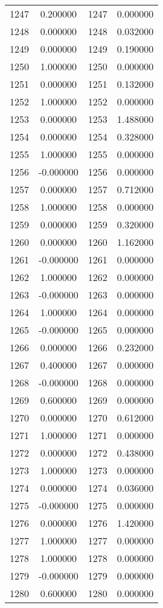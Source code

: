 \documentclass[12pt]{article}
\begin{document}
\begin{longtable}{@{}cccc@{}}
1247 & 0.200000 & 1247 & 0.000000 \\
1248 & 0.000000 & 1248 & 0.032000 \\
1249 & 0.000000 & 1249 & 0.190000 \\
1250 & 1.000000 & 1250 & 0.000000 \\
1251 & 0.000000 & 1251 & 0.132000 \\
1252 & 1.000000 & 1252 & 0.000000 \\
1253 & 0.000000 & 1253 & 1.488000 \\
1254 & 0.000000 & 1254 & 0.328000 \\
1255 & 1.000000 & 1255 & 0.000000 \\
1256 & -0.000000 & 1256 & 0.000000 \\
1257 & 0.000000 & 1257 & 0.712000 \\
1258 & 1.000000 & 1258 & 0.000000 \\
1259 & 0.000000 & 1259 & 0.320000 \\
1260 & 0.000000 & 1260 & 1.162000 \\
1261 & -0.000000 & 1261 & 0.000000 \\
1262 & 1.000000 & 1262 & 0.000000 \\
1263 & -0.000000 & 1263 & 0.000000 \\
1264 & 1.000000 & 1264 & 0.000000 \\
1265 & -0.000000 & 1265 & 0.000000 \\
1266 & 0.000000 & 1266 & 0.232000 \\
1267 & 0.400000 & 1267 & 0.000000 \\
1268 & -0.000000 & 1268 & 0.000000 \\
1269 & 0.600000 & 1269 & 0.000000 \\
1270 & 0.000000 & 1270 & 0.612000 \\
1271 & 1.000000 & 1271 & 0.000000 \\
1272 & 0.000000 & 1272 & 0.438000 \\
1273 & 1.000000 & 1273 & 0.000000 \\
1274 & 0.000000 & 1274 & 0.036000 \\
1275 & -0.000000 & 1275 & 0.000000 \\
1276 & 0.000000 & 1276 & 1.420000 \\
1277 & 1.000000 & 1277 & 0.000000 \\
1278 & 1.000000 & 1278 & 0.000000 \\
1279 & -0.000000 & 1279 & 0.000000 \\
1280 & 0.600000 & 1280 & 0.000000 \\

\end{longtable}
\end{document}

